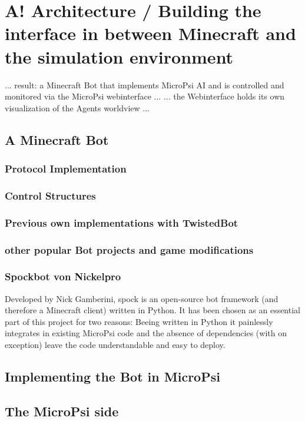 \section{A! Architecture / Building the interface in between Minecraft and the simulation environment}
... result: a Minecraft Bot that implements MicroPsi AI and is controlled and monitored via the MicroPsi webinterface ...
... the Webinterface holds its own visualization of the Agents worldview ...

\subsection{A Minecraft Bot}

\subsubsection{Protocol Implementation}

\subsubsection{Control Structures}

\subsubsection{Previous own implementations with TwistedBot}

\subsubsection{other popular Bot projects and game modifications}

\subsubsection{Spockbot von Nickelpro}
Developed by Nick Gamberini, spock is an open-source bot framework (and therefore a Minecraft client) written in Python. It has been chosen as an essential part of this project for two reasons: Beeing written in Python it painlessly integrates in existing MicroPsi code and the absence of dependencies (with on exception) leave the code understandable and easy to deploy.

\subsection{Implementing the Bot in MicroPsi}


\subsection{The MicroPsi side}

